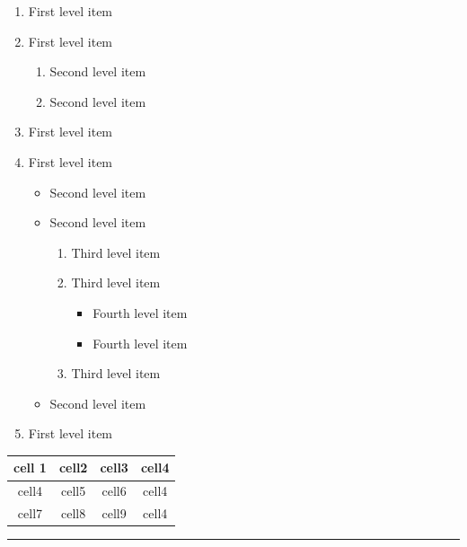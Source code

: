 \documentclass{article}
\begin{document}
\begin{enumerate}
    \item First level item
    \item First level item
    \begin{enumerate}
        \item Second level item
        \item Second level item
    \end{enumerate}
    \item First level item
    \item First level item
    \begin{itemize}
        \item Second level item
        \item Second level item
        \begin{enumerate}
            \item Third level item
            \item Third level item
            \begin{itemize}
              \item Fourth level item
              \item Fourth level item
            \end{itemize}
            \item Third level item
        \end{enumerate}
        \item Second level item
    \end{itemize}
    \item First level item
\end{enumerate}



\begin{tabular}{|c|c|c|c|} 
    \hline
    cell       1 & cell2 & cell3 & cell4\\ 
    \hline
    cell4 & cell5 & cell6 & cell4\\ 
    \hline
    cell7 & cell8 & cell9 & cell4\\ 
    \hline
\end{tabular}



\hrule
\end{document}
